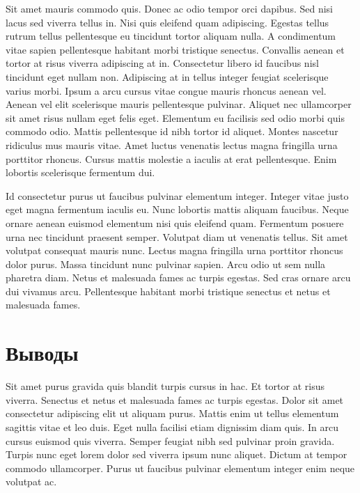 \documentclass[a4paper, 14pt]{extarticle}
\begin{document}
Sit amet mauris commodo quis. Donec ac odio tempor orci dapibus. Sed nisi lacus sed viverra tellus in. Nisi quis eleifend quam adipiscing. Egestas tellus rutrum tellus pellentesque eu tincidunt tortor aliquam nulla. A condimentum vitae sapien pellentesque habitant morbi tristique senectus. Convallis aenean et tortor at risus viverra adipiscing at in. Consectetur libero id faucibus nisl tincidunt eget nullam non. Adipiscing at in tellus integer feugiat scelerisque varius morbi. Ipsum a arcu cursus vitae congue mauris rhoncus aenean vel. Aenean vel elit scelerisque mauris pellentesque pulvinar. Aliquet nec ullamcorper sit amet risus nullam eget felis eget. Elementum eu facilisis sed odio morbi quis commodo odio. Mattis pellentesque id nibh tortor id aliquet. Montes nascetur ridiculus mus mauris vitae. Amet luctus venenatis lectus magna fringilla urna porttitor rhoncus. Cursus mattis molestie a iaculis at erat pellentesque. Enim lobortis scelerisque fermentum dui.

Id consectetur purus ut faucibus pulvinar elementum integer. Integer vitae justo eget magna fermentum iaculis eu. Nunc lobortis mattis aliquam faucibus. Neque ornare aenean euismod elementum nisi quis eleifend quam. Fermentum posuere urna nec tincidunt praesent semper. Volutpat diam ut venenatis tellus. Sit amet volutpat consequat mauris nunc. Lectus magna fringilla urna porttitor rhoncus dolor purus. Massa tincidunt nunc pulvinar sapien. Arcu odio ut sem nulla pharetra diam. Netus et malesuada fames ac turpis egestas. Sed cras ornare arcu dui vivamus arcu. Pellentesque habitant morbi tristique senectus et netus et malesuada fames.

\section*{Выводы}
Sit amet purus gravida quis blandit turpis cursus in hac. Et tortor at risus viverra. Senectus et netus et malesuada fames ac turpis egestas. Dolor sit amet consectetur adipiscing elit ut aliquam purus. Mattis enim ut tellus elementum sagittis vitae et leo duis. Eget nulla facilisi etiam dignissim diam quis. In arcu cursus euismod quis viverra. Semper feugiat nibh sed pulvinar proin gravida. Turpis nunc eget lorem dolor sed viverra ipsum nunc aliquet. Dictum at tempor commodo ullamcorper. Purus ut faucibus pulvinar elementum integer enim neque volutpat ac.
\end{document}
